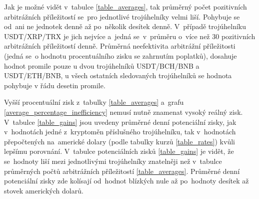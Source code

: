 \documentclass[thesis=B,czech]{FITthesis}[2019/03/21]
\begin{document}
Jak je možné vidět v~tabulce \ref{table_averages}, tak průměrný počet pozitivních arbitrážních příležitostí se~pro jednotlivé trojúhelníky velmi liší. Pohybuje se od~ani ne jednotek denně až po~několik desítek denně. V~případě trojúhelníku \linebreak USDT/XRP/TRX je jich nejvíce a~jedná se~v~průměru o~více než 30 pozitivních arbitrážních příležitostí denně. Průměrná neefektivita arbitrážní příležitosti (jedná se~o hodnotu procentuálního zisku se zahrnutím poplatků), dosahuje hodnot promile pouze u dvou trojúhelníků USDT/BCH/BNB \linebreak a USDT/ETH/BNB, u všech ostatních sledovaných trojúhelníků se hodnota pohybuje v řádu desetin promile.

Vyšší procentuální zisk z~tabulky \ref{table_averages} a~grafu \ref{average_percentage_inefficiency} nemusí nutně znamenat vysoký reálný zisk. V~tabulce \ref{table_gains} jsou uvedeny průměrné denní potenciální zisky, jak v~hodnotách jedné z~kryptoměn příslušného trojúhelníku, tak v~hodnotách přepočtených na~americké dolary (podle tabulky kurzů \ref{table_rates}) kvůli lepšímu porovnání. V~tabulce potenciálních zisků \ref{table_gains} je vidět, že se~hodnoty liší mezi jednotlivými trojúhelníky znatelněji než v~tabulce průměrných počtů arbitrážních příležitostí \ref{table_averages}. Průměrné denní potenciální zisky zde kolísají od~hodnot blízkých nule až po~hodnoty desítek až stovek amerických dolarů. 

\end{document}
